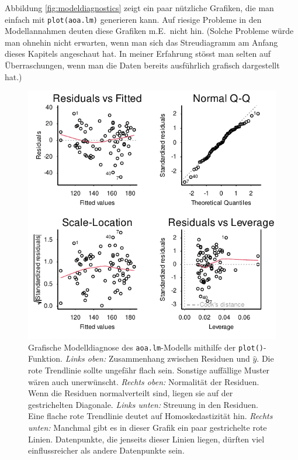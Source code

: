 \documentclass[oneside, 10pt]{book}\usepackage[]{graphicx}\usepackage[]{xcolor}
\newenvironment{knitrout}{}{} %
\begin{document}
Abbildung \ref{fig:modeldiagnostics} zeigt ein paar nützliche
Grafiken, die man einfach mit \texttt{plot(aoa.lm)} generieren
kann. Auf riesige Probleme in den Modellannahmen deuten diese
Grafiken m.E.\ nicht hin. (Solche Probleme würde man ohnehin
nicht erwarten, wenn man sich das Streudiagramm am Anfang dieses
Kapitels angeschaut hat. In meiner Erfahrung stösst man selten
auf Überraschungen, wenn man die Daten bereits ausführlich
grafisch dargestellt hat.)
\begin{knitrout}
\color{fgcolor}\begin{figure}[tp]

{\centering \includegraphics[width=.66\textwidth]{figs/unnamed-chunk-237-1} 

}

\caption{Grafische Modelldiagnose des \texttt{aoa.lm}-Modells mithilfe der \texttt{plot()}-Funktion. \textit{Links oben:} Zusammenhang zwischen Residuen und $\widehat{y}$. Die rote Trendlinie sollte ungefähr flach sein. Sonstige auffällige Muster wären auch unerwünscht. \textit{Rechts oben:} Normalität der Residuen. Wenn die Residuen normalverteilt sind, liegen sie auf der gestrichelten Diagonale. \textit{Links unten:} Streuung in den Residuen. Eine flache rote Trendlinie deutet auf Homoskedastizität hin. \textit{Rechts unten:} Manchmal gibt es in dieser Grafik ein paar gestrichelte rote Linien. Datenpunkte, die jenseits dieser Linien liegen, dürften viel einflussreicher als andere Datenpunkte sein.\label{fig:modeldiagnostics}}\label{fig:unnamed-chunk-237}
\end{figure}

\end{knitrout}
\end{document}
